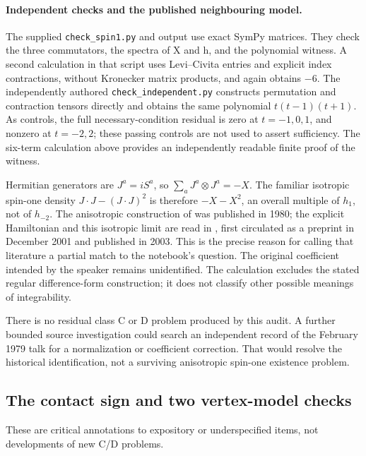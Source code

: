 \paragraph{Independent checks and the published neighbouring model.}
The supplied \texttt{check\_spin1.py} and output use exact SymPy matrices.
They check the three commutators, the spectra of X and h, and the
polynomial witness. A second calculation in that script uses
Levi--Civita entries and explicit index contractions, without Kronecker
matrix products, and again obtains \(-6\). The independently authored
\texttt{check\_independent.py} constructs permutation and contraction
tensors directly and obtains the same polynomial
\(t(t-1)(t+1)\). As controls, the full necessary-condition residual is
zero at \(t=-1,0,1\), and nonzero at \(t=-2,2\); these passing controls
are not used to assert sufficiency. The six-term calculation above
provides an independently readable finite proof of the witness.

Hermitian generators are \(J^a=iS^a\), so
\(\sum_aJ^a\otimes J^a=-X\). The familiar isotropic spin-one density
\(J\cdot J-(J\cdot J)^2\) is therefore \(-X-X^2\), an overall multiple
of \(h_1\), not of \(h_{-2}\). The anisotropic construction of
\citet{zamolodchikovfateev1980spin} was published in 1980; the explicit
Hamiltonian and this isotropic limit are read in
\citet[Sec.~5, eqs.~(52)--(55)]{bytsko2003xxz}, first circulated as a
preprint in December 2001 and published in 2003. This is the precise
reason for calling that literature a partial match to the notebook's
question. The original coefficient intended by the speaker remains
unidentified. The calculation excludes the stated regular
difference-form construction; it does not classify other possible
meanings of integrability.

There is no residual class C or D problem produced by this audit. A
further bounded source investigation could search an independent record
of the February 1979 talk for a normalization or coefficient correction.
That would resolve the historical identification, not a surviving
anisotropic spin-one existence problem.


\subsection{The contact sign and two vertex-model checks}
These are critical annotations to expository or underspecified items, not developments of new C/D problems.

